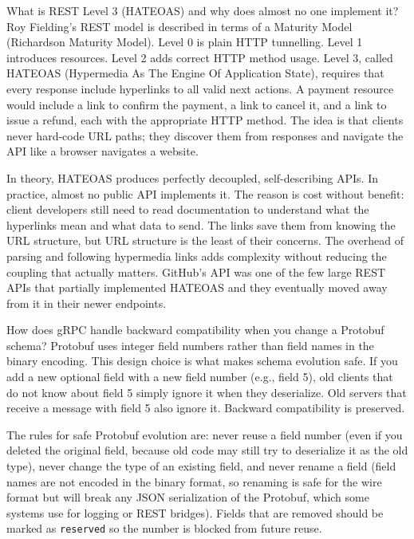\documentclass[11pt,a4paper]{article}
\begin{document}
\begin{curiobox}{What is REST Level 3 (HATEOAS) and why does almost no one implement it?}
Roy Fielding's REST model is described in terms of a Maturity Model (Richardson Maturity Model). Level 0 is plain HTTP tunnelling. Level 1 introduces resources. Level 2 adds correct HTTP method usage. Level 3, called HATEOAS (Hypermedia As The Engine Of Application State), requires that every response include hyperlinks to all valid next actions. A payment resource would include a link to confirm the payment, a link to cancel it, and a link to issue a refund, each with the appropriate HTTP method. The idea is that clients never hard-code URL paths; they discover them from responses and navigate the API like a browser navigates a website.

In theory, HATEOAS produces perfectly decoupled, self-describing APIs. In practice, almost no public API implements it. The reason is cost without benefit: client developers still need to read documentation to understand what the hyperlinks mean and what data to send. The links save them from knowing the URL structure, but URL structure is the least of their concerns. The overhead of parsing and following hypermedia links adds complexity without reducing the coupling that actually matters. GitHub's API was one of the few large REST APIs that partially implemented HATEOAS and they eventually moved away from it in their newer endpoints.
\end{curiobox}

\begin{curiobox}{How does gRPC handle backward compatibility when you change a Protobuf schema?}
Protobuf uses integer field numbers rather than field names in the binary encoding. This design choice is what makes schema evolution safe. If you add a new optional field with a new field number (e.g., field 5), old clients that do not know about field 5 simply ignore it when they deserialize. Old servers that receive a message with field 5 also ignore it. Backward compatibility is preserved.

The rules for safe Protobuf evolution are: never reuse a field number (even if you deleted the original field, because old code may still try to deserialize it as the old type), never change the type of an existing field, and never rename a field (field names are not encoded in the binary format, so renaming is safe for the wire format but will break any JSON serialization of the Protobuf, which some systems use for logging or REST bridges). Fields that are removed should be marked as \texttt{reserved} so the number is blocked from future reuse.
\end{curiobox}
\end{document}
